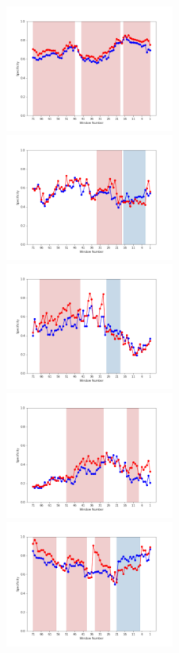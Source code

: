 \documentclass[11pt]{jreport}
\begin{document}
\begin{figure}[H]
\begin{center}
    \includegraphics[width=0.495\textwidth]{Uenaka_fig/RQ2_result/Nova_review_Specificity.pdf}
    \includegraphics[width=0.495\textwidth]{Uenaka_fig/RQ2_result/Neutron_review_Specificity.pdf}
    \includegraphics[width=0.495\textwidth]{Uenaka_fig/RQ2_result/Cinder_review_Specificity.pdf}
    \includegraphics[width=0.495\textwidth]{Uenaka_fig/RQ2_result/Keystone_review_Specificity.pdf}
    \includegraphics[width=0.495\textwidth]{Uenaka_fig/RQ2_result/Swift_review_Specificity.pdf}

\end{center}
\end{figure}
\end{document}
